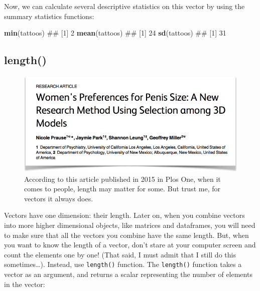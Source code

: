 \documentclass[]{book}
\newenvironment{Shaded}{\begin{snugshade}}{\end{snugshade}}
\newcommand{\KeywordTok}[1]{\textcolor[rgb]{0.13,0.29,0.53}{\textbf{#1}}}
\newcommand{\NormalTok}[1]{#1}
\theoremstyle{definition}
\theoremstyle{definition}
\theoremstyle{remark}
\begin{document}
Now, we can calculate several descriptive statistics on this vector by
using the summary statistics functions:

\begin{Shaded}
\begin{Highlighting}[]
\KeywordTok{min}\NormalTok{(tattoos)}
\NormalTok{## [1] 2}
\KeywordTok{mean}\NormalTok{(tattoos)}
\NormalTok{## [1] 24}
\KeywordTok{sd}\NormalTok{(tattoos)}
\NormalTok{## [1] 31}
\end{Highlighting}
\end{Shaded}

\subsection{length()}\label{length}

\begin{figure}

{\centering \includegraphics[width=0.5\linewidth]{images/penissize} 

}

\caption{According to this article published in 2015 in Plos One, when it comes to people, length may matter for some. But trust me, for vectors it always does.}\label{fig:unnamed-chunk-121}
\end{figure}

Vectors have one dimension: their length. Later on, when you combine
vectors into more higher dimensional objects, like matrices and
dataframes, you will need to make sure that all the vectors you combine
have the same length. But, when you want to know the length of a vector,
don't stare at your computer screen and count the elements one by one!
(That said, I must admit that I still do this sometimes\ldots{}).
Instead, use \texttt{length()} function. The \texttt{length()} function
takes a vector as an argument, and returns a scalar representing the
number of elements in the vector:
\end{document}
